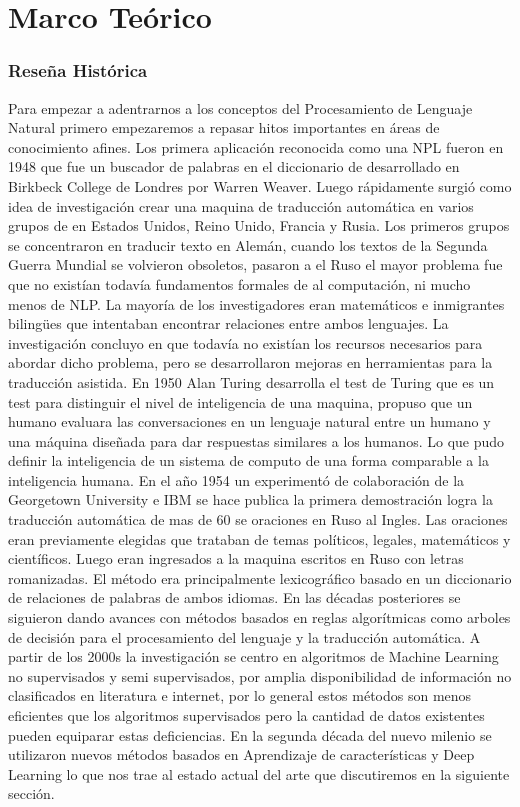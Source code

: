 
\chapter[Revisión de literatura]{Marco Teórico}


\subsection[Reseña Histórica]{Reseña Histórica}
Para empezar a adentrarnos a los conceptos del Procesamiento de Lenguaje Natural primero empezaremos a repasar hitos importantes en áreas de conocimiento afines.
Los primera aplicación reconocida como una NPL fueron en 1948 que fue un buscador de palabras en el diccionario de desarrollado en Birkbeck College de Londres por Warren Weaver. Luego rápidamente surgió como idea de investigación crear una maquina de traducción automática en varios grupos de en Estados Unidos, Reino Unido, Francia y Rusia. Los primeros grupos se concentraron en traducir texto en Alemán, cuando los textos de la Segunda Guerra Mundial se volvieron obsoletos, pasaron a el Ruso el mayor problema fue que no existían todavía fundamentos formales de al computación, ni mucho menos de NLP. La mayoría de los investigadores eran matemáticos e inmigrantes bilingües que intentaban encontrar relaciones entre ambos lenguajes. La investigación concluyo en que todavía no existían los recursos necesarios para abordar dicho problema, pero se desarrollaron mejoras en herramientas para la traducción asistida.\cite{hancox}
En 1950 Alan Turing desarrolla el test de Turing que es un test para distinguir el nivel de inteligencia de una maquina, propuso que un humano evaluara las conversaciones en un lenguaje natural entre un humano y una máquina diseñada para dar respuestas similares a los humanos. Lo que pudo definir la inteligencia de un sistema de computo de una forma comparable a la inteligencia humana.
En el año 1954 un experimentó de colaboración de la Georgetown University e IBM se  hace publica la primera demostración logra la traducción automática de mas de 60 se oraciones en Ruso al Ingles. Las oraciones eran previamente elegidas que trataban de temas políticos, legales, matemáticos y científicos. Luego eran ingresados a la maquina escritos en Ruso con letras romanizadas. El método era principalmente lexicográfico basado en un diccionario de relaciones de palabras de ambos idiomas.\cite{ibm_2003}
En las décadas posteriores se siguieron dando avances con métodos basados en reglas algorítmicas como arboles de decisión para el procesamiento del lenguaje y la traducción automática. A partir de los 2000s la investigación se centro en algoritmos de Machine Learning no supervisados y semi supervisados, por amplia disponibilidad de información no clasificados en literatura e internet, por lo general estos métodos son menos eficientes que los algoritmos supervisados pero la cantidad de datos existentes pueden equiparar estas deficiencias. En la segunda década del nuevo milenio se utilizaron nuevos métodos basados en Aprendizaje de características y Deep Learning lo que nos trae al estado actual del arte que discutiremos en la siguiente sección.




